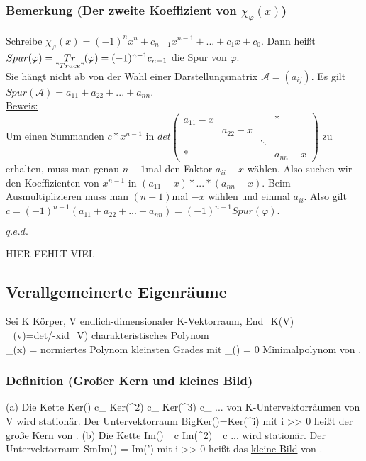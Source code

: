 \documentclass[a4paper]{article}
\newcommand{\ul}{\underline}
\renewcommand{\qed}{\begin{flushright}
\ul{\(q.e.d.\)}
\end{flushright}}
\let\phi\varphi
\begin{document}
\subsubsection{Bemerkung (Der zweite Koeffizient von \(\chi_\phi(x)\))}
Schreibe \(\chi_\phi(x)=(-1)^nx^n+c_{n-1}x^{n-1}+...+c_1x+c_0\). Dann heißt \(Spur(\phi)=\underset{"Trace"}{Tr}(\phi)=(-1)^{n-1}c_{n-1}\) die \ul{Spur} von \(\phi\).\\
Sie hängt nicht ab von der Wahl einer Darstellungsmatrix \(\mathcal{A}=(a_{ij})\). Es gilt \(Spur(\mathcal{A})=a_{11}+a_{22}+...+a_{nn}\).\\
\ul{Beweis:}\\
Um einen Summanden \(c*x^{n-1}\) in \(det\begin{pmatrix}
a_{11}-x & & & * \\
 & a_{22}-x & & \\
 & & \ddots & \\
* & & & a_{nn}-x
\end{pmatrix}\) zu erhalten, muss man genau \(n-1\)mal den Faktor \(a_{ii}-x\) wählen. Also suchen wir den Koeffizienten von \(x^{n-1}\) in \((a_{11}-x)*...*(a_{nn}-x)\). Beim Ausmultiplizieren muss man \((n-1)\)mal \(-x\) wählen und einmal \(a_{ii}\). Also gilt \(c=(-1)^{n-1}(a_{11}+a_{22}+...+a_{nn})=(-1)^{n-1} Spur(\phi)\).
\qed
HIER FEHLT VIEL
\setcounter{subsection}{21}
\subsection{Verallgemeinerte Eigenräume}
Sei K Körper, V endlich-dimensionaler K-Vektorraum, \phi \in End_K(V)\\
\chi_\phi(v)=det/\phi-x\cdot id_V) charakteristisches Polynom\\
\mu_\phi(x) = normiertes Polynom kleinsten Grades mit \mu_\phi (\phi) = 0 \equals Minimalpolynom von \phi.
\subsubsection{Definition (Großer Kern und kleines Bild)}
(a) Die Kette Ker(\phi) c_ Ker(\phi^2) c_ Ker(\phi^3) c_ ... von K-Untervektorräumen von V wird stationär. Der Untervektorraum BigKer(\phi)=Ker(\phi^i) mit i >> 0 heißt der \ul{große Kern} von \phi.
(b) Die Kette Im(\phi) _c Im(\phi^2) _c ... wird stationär. Der Untervektorraum SmIm(\phi) = Im(\phi') mit i >> 0 heißt das \ul{kleine Bild} von \phi.
\end{document}
